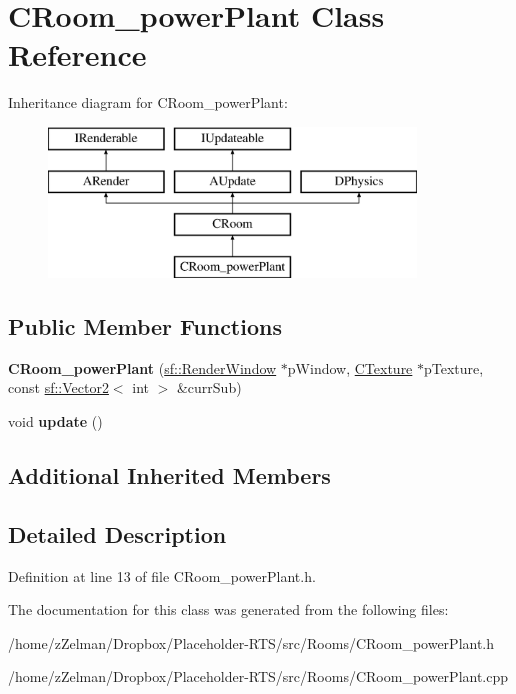 \hypertarget{classCRoom__powerPlant}{\section{C\-Room\-\_\-power\-Plant Class Reference}
\label{classCRoom__powerPlant}
}
Inheritance diagram for C\-Room\-\_\-power\-Plant\-:\begin{figure}[H]
\begin{center}
\leavevmode
\includegraphics[height=4.000000cm]{classCRoom__powerPlant}
\end{center}
\end{figure}
\subsection*{Public Member Functions}
\begin{DoxyCompactItemize}
\item 
\hypertarget{classCRoom__powerPlant_a6741038a350174c9995065cb82573956}{{\bfseries C\-Room\-\_\-power\-Plant} (\hyperlink{classsf_1_1RenderWindow}{sf\-::\-Render\-Window} $\ast$p\-Window, \hyperlink{classCTexture}{C\-Texture} $\ast$p\-Texture, const \hyperlink{classsf_1_1Vector2}{sf\-::\-Vector2}$<$ int $>$ \&curr\-Sub)}\label{classCRoom__powerPlant_a6741038a350174c9995065cb82573956}

\item 
\hypertarget{classCRoom__powerPlant_a8861ab0e2382e25b0130b29326717121}{void {\bfseries update} ()}\label{classCRoom__powerPlant_a8861ab0e2382e25b0130b29326717121}

\end{DoxyCompactItemize}
\subsection*{Additional Inherited Members}


\subsection{Detailed Description}


Definition at line 13 of file C\-Room\-\_\-power\-Plant.\-h.



The documentation for this class was generated from the following files\-:\begin{DoxyCompactItemize}
\item 
/home/z\-Zelman/\-Dropbox/\-Placeholder-\/\-R\-T\-S/src/\-Rooms/C\-Room\-\_\-power\-Plant.\-h\item 
/home/z\-Zelman/\-Dropbox/\-Placeholder-\/\-R\-T\-S/src/\-Rooms/C\-Room\-\_\-power\-Plant.\-cpp\end{DoxyCompactItemize}
